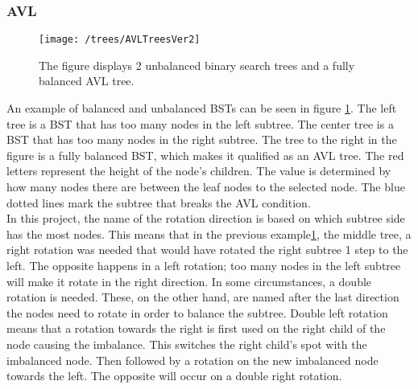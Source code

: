 \subsubsection{AVL}
\begin{figure}[H]
    \centering
    \texttt{[image: /trees/AVLTreesVer2]}    
    \caption{The figure displays 2 unbalanced binary search trees and a fully balanced AVL tree. }
    \label{fig:AVLTrees}
\end{figure}
\noindent
An example of balanced and unbalanced BSTs can be seen in figure \ref{fig:AVLTrees}. The left tree is a BST that has too many nodes in the left subtree. The center tree is a BST that has too many nodes in the right subtree. The tree to the right in the figure is a fully balanced BST, which makes it qualified as an AVL tree. The red letters represent the height of the node's children. The value is determined by how many nodes there are between the leaf nodes to the selected node. The blue dotted lines mark the subtree that breaks the AVL condition.
\\[11pt]
In this project, the name of the rotation direction is based on which subtree side has the most nodes. This means that in the previous example\ref{fig:AVLTrees}, the middle tree, a right rotation was needed that would have rotated the right subtree 1 step to the left. The opposite happens in a left rotation; too many nodes in the left subtree will make it rotate in the right direction. In some circumstances, a double rotation is needed. These, on the other hand, are named after the last direction the nodes need to rotate in order to balance the subtree. Double left rotation means that a rotation towards the right is first used on the right child of the node causing the imbalance. This switches the right child's spot with the imbalanced node. Then followed by a rotation on the new imbalanced node towards the left. The opposite will occur on a double right rotation.
\\[11pt]
